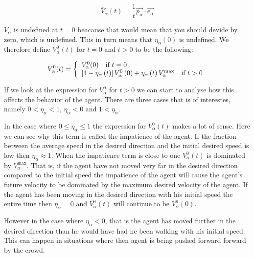 \begin{equation}\label{averagespeed}
   \overline{V}_{\alpha} \left( t \right) =
   \frac{1}{t} \vec{p_{\alpha}}\cdot \vec{e_{\alpha}} 
\end{equation}

$\overline{V}_{\alpha}$ is undefined at $t=0$ beacause that would mean 
that you should devide by zero, which is undefined. This in turn means 
that $\eta_{\alpha}(0)$ is undefined. We therefore define 
$V_{\alpha}^{0}(t)$ for $t=0$ and $t>0$ to be the following:

\[
  V_{\alpha}^{0} (t) = \left\{ 
  \begin{array}{l l}
    V_{\alpha}^{0}(0) \quad \text{if $t=0$}\\
    \left[ 1 - \eta_{\alpha} \left( t \right) \right] 
    V_{\alpha}^{0} \left( 0 \right) +
    \eta_{\alpha} \left( t \right)V_{\alpha}^{\text{max}} \quad \text{if $t>0$}\\
  \end{array} \right.
\]

If we look at the expression for $V_{\alpha}^{0}$ for $t>0$ we can 
start to analyse how this affects the behavior of the agent. There 
are three cases that is of interestes, namely $0 < \eta_{\alpha} < 1$, 
$\eta_{\alpha} < 0$ and $1 < \eta_{\alpha} $.

In the case where $0 \leq \eta_{\alpha} \leq 1$ the expression for 
$V_{\alpha}^{0} \left( t \right)$ makes a lot of sense. Here we can see why this term 
is called the impatience of the agent. If the fraction  between the average 
speed in the desired direction and the initial desired speed is low then 
$\eta_{\alpha} \approx 1$. 
When the impatience term is close to one $V_{\alpha}^{0} \left( t \right)$ is 
dominated by $V_{\alpha}^{\text{max}}$. That is, if the agent have not moved 
very far in the desired direction compared to the initial speed the impatience 
of the agent will cause the agent's future velocity to be dominated by the 
maximum desired velocity of the agent. 
If the agent has been moving in the desired direction with his initial speed 
the entire time then $\eta_{\alpha} = 0$  and $V_{\alpha}^{0} \left( t 
\right)$ will continue to be $V_{\alpha}^{0} \left( 0 \right)$. 

However in the case where $\eta_{\alpha} < 0$, that is the agent has moved 
further in the desired direction than he would have had he been walking with his 
initial speed. This can happen in situations where then agent is being pushed 
forward forward by the crowd.

